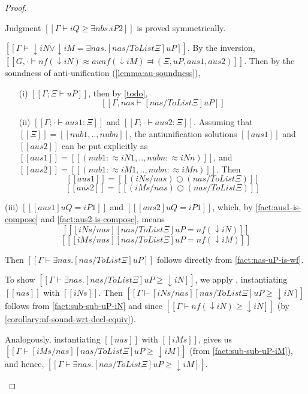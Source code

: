 \begin{proof}
\begin{caseof}
     Judgment $[[Γ ⊢ iQ ≥ ∃nbs.iP2]]$ is proved symmetrically.
  \item $[[Γ ⊨ ↓iN ∨ ↓iM = ∃nas.[nas / ToList Ξ]uP]]$.
    By the inversion, $[[G,· ⊨ nf(↓iN) ≈au nf(↓iM) ⫤ (Ξ, uP, aus1, aus2)]]$.
    Then by the soundness of anti-unification (\cref{lemma:au-soundness}),
    \begin{enumerate}
    \item[(i)] $[[Γ ; Ξ ⊢ uP]]$, then
      by \cref{todo},
      \begin{equation} \label{fact:nas-uP-is-wf} [[Γ, nas ⊢ [nas / ToList Ξ]uP]] \end{equation}
    \item[(ii)] $[[Γ ; · ⊢ aus1 : Ξ]]$ and $[[Γ ; · ⊢ aus2 : Ξ]]$.
      Assuming that $[[Ξ]] = [[nub1,..,nubn]]$,
      the antiunification solutions $[[aus1]]$ and $[[aus2]]$ can be
      put explicitly as $[[aus1]] = [[(nub1 :≈ iN1,..,nubn :≈ iNn)]]$,
      and $[[aus2]] = [[(nub1 :≈ iM1,..,nubn :≈ iMn)]]$.
      Then
      \begin{equation}
        \label{fact:aus1-is-compose}
        [[ aus1 ]] = [[ (iNs / nas) ○ (nas / ToList Ξ) ]] 
      \end{equation}
      \begin{equation}
        \label{fact:aus2-is-compose}
        [[ aus2 ]] = [[ (iMs / nas) ○ (nas / ToList Ξ) ]]
      \end{equation}
    \end{enumerate}
  \item[(iii)] $[[ [aus1] uQ = iP1 ]]$ and $[[ [aus2] uQ = iP1 ]]$,
    which, by \ref{fact:aus1-is-compose} and \ref{fact:aus2-is-compose},
    means
    \begin{equation}
      \label{fact:sub-sub-uP-iN}
      [[ [iNs / nas][nas / ToList Ξ]uP = nf(↓iN) ]]
    \end{equation}
    \begin{equation}
      \label{fact:sub-sub-uP-iM}
      [[ [iMs / nas][nas / ToList Ξ]uP = nf(↓iM) ]]
    \end{equation}

    Then $[[Γ ⊢ ∃nas.[nas / ToList Ξ]uP]]$
    follows directly from \ref{fact:nas-uP-is-wf}.

    To show $[[Γ ⊢ ∃nas.[nas / ToList Ξ]uP ≥ ↓iN]]$,
    we apply ,
    instantiating $[[nas]]$ with $[[iNs]]$.
    Then $[[Γ ⊢ [iNs / nas][nas / ToList Ξ]uP ≥ ↓iN ]]$ follows
    from \ref{fact:sub-sub-uP-iN} and 
    since $[[Γ ⊢ nf(↓iN) ≥ ↓iN]]$ (by \cref{corollary:nf-sound-wrt-decl-equiv}).

    Analogously, instantiating $[[nas]]$ with $[[iMs]]$,
    gives us $[[Γ ⊢ [iMs / nas][nas / ToList Ξ]uP ≥ ↓iM ]]$
    (from \ref{fact:sub-sub-uP-iM}), and hence,
    $[[Γ ⊢ ∃nas.[nas / ToList Ξ]uP ≥ ↓iM]]$.

  \end{caseof}

\end{proof}


